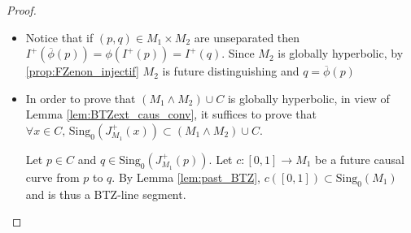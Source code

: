 \documentclass[a4paper,12pt]{article}
\def\U{\mathcal U}
\def\V{\mathcal V}
\def\sing{\mathrm{Sing}}
\newcommand{\mass}[1]{{\mathbb E}^{1,2}_{#1}}
\def\pgcd{M_1\wedge M_2}
\def\ppcm{M_1\vee M_2}
\newcommand{\fonction}[5]{\displaystyle#1:\begin{array}{l|rcl}
& \displaystyle #2 & \longrightarrow & \displaystyle #3 \\
    & \displaystyle #4 & \longmapsto & \displaystyle #5 \end{array}}
\begin{document}
\begin{proof}
\begin{itemize}
						Consider now a family $(\U_p\xrightarrow{\psi_p} \V_p, \U_{p'} \xrightarrow{\psi_{p'}} \V_{p'}, \gamma_p)_{p\in C}$ of such charts. For all $p\in C$, $\U_p\cap (\pgcd)$ is connected, the $\mass{\geq0}$-morphisms  
$$	
						\fonction
							{\phi_p}
							{(\pgcd) \cup \U_p}
							{M_2}
							{x}
							{
								\left \lbrace
									\begin{array}{ll}
										\phi(x)										& 	~\mathrm{if}~x\in \pgcd\\
										\psi_{p'}^{-1}\circ \gamma \circ \psi_p(x)	& ~\mathrm{if}~x \in \U_p
									\end{array}
								\right.
							}.
					$$				
					are then well defined.
						Each set $(\pgcd )\cup \U_p$ for $p\in C$ is open and connected, furthermore the intersection of two such domains contains $\pgcd$ which is connected therefore: 
						$$ \forall p,q\in C, \quad \left[(\pgcd )\cup \U_p\right] \cap \left[(\pgcd )\cup \U_q\right] \text{ is connected.}$$
						 By analyticity, the $\mass{\geq0}$-morphism
						$$	
						\fonction
							{\overline \phi}
							{(\pgcd) \cup \bigcup_{p\in C}\U_p}
							{M_2}
							{x}
							{
								\phi_p(x) \text{ if } x\in (\pgcd )\cup \U_p
							}
					$$
					is well defined. 
					
					For every $p\in C$ and every
					$q\in \sing_0(\U_p)$ the points $q,\overline \phi(q)$  are unseparated in $\ppcm$.
					Therefore, either $q\in C$ or $q\in \pgcd$;  in any case 
					
					$$(\pgcd)\cup C = (\pgcd)\bigcup_{p\in C} \U_p$$
					so $(\pgcd)\cup C$ is open and $\phi$ extends to $\overline \phi: (\pgcd)\cup C \rightarrow M_2$.
					
				\item Notice that if $(p,q)\in M_1\times M_2$ are unseparated then $I^+(\overline \phi(p))=\phi(I^+(p))=I^+(q)$. Since $M_2$ is globally hyperbolic, by \ref{prop:FZenon_injectif} $M_2$ is future distinguishing and $q=\overline\phi(p)$
						
				\item In order to prove that $(\pgcd) \cup C$ is globally hyperbolic, in view of Lemma \ref{lem:BTZext_caus_conv}, it suffices to prove that $\forall x\in C,\, \sing_0(J^+_{M_1}(x)) \subset (\pgcd) \cup C$.
				
				 Let $p\in C$ and $q\in \sing_0(J^+_{M_1}(p))$. Let $c:[0,1]\rightarrow M_1$ be a future causal curve from $p$ to $q$. By Lemma \ref{lem:past_BTZ}, $c([0,1])\subset \sing_0(M_1)$ and is thus a BTZ-line segment. 
				

\end{itemize}
\end{proof}
\end{document}
